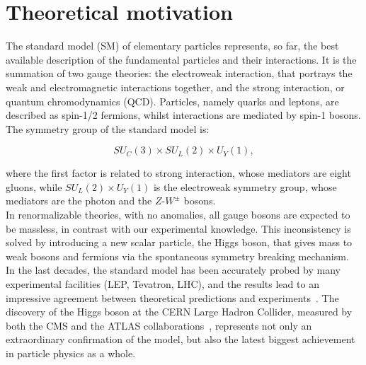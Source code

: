 \chapter{Theoretical motivation}
\label{chap:theory}

The standard model (SM) of elementary particles represents, so far, the best available description of the fundamental particles and their interactions. It is the summation of two gauge theories: the electroweak interaction, that portrays the weak and electromagnetic interactions together, and the strong interaction, or quantum chromodynamics (QCD). Particles, namely quarks and leptons, are described as spin-1/2 fermions, whilst interactions are mediated by spin-1 bosons. The symmetry group of the standard model is:

\begin{equation}
SU_{C}(3) \times SU_L (2) \times U_Y (1),
\label{eq:theory_SMgroup}
\end{equation}

\noindent where the first factor is related to strong interaction, whose mediators are eight gluons, while $SU_L (2) \times U_Y (1)$ is the electroweak symmetry group, whose mediators are the photon and the $Z$-$W^{\pm}$ bosons.\\
In renormalizable theories, with no anomalies, all gauge bosons are expected to be massless, in contrast with our experimental knowledge. This inconsistency is solved by introducing a new scalar particle, the Higgs boson, that gives mass to weak bosons and fermions via the spontaneous symmetry breaking mechanism.
\\

\noindent In the last decades, the standard model has been accurately probed by many experimental facilities (LEP, Tevatron, LHC), and the results lead to an impressive agreement between theoretical predictions and experiments~\cite{Baak:2013ppa}. The discovery of the Higgs boson at the CERN Large Hadron Collider, measured by both the CMS and the ATLAS collaborations~\cite{bib:Aad20121,bib:Chatrchyan201230,bib:Chatrchyan2013lba,Aad:2013xqa,Khachatryan:2014jba,Aad:2014aba,Aad:2015zhl}, represents not only an extraordinary confirmation of the model, but also the latest biggest achievement in particle physics as a whole.

